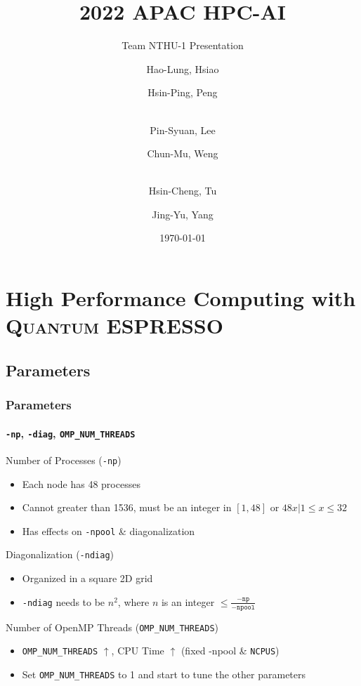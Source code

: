 \documentclass{beamer}
\title{2022 APAC HPC-AI}
\subtitle{Team NTHU-1 Presentation}
\author[NTHU-1]{
    Hao-Lung, Hsiao \and Hsin-Ping, Peng \and\\
    Pin-Syuan, Lee \and Chun-Mu, Weng \and\\
    Hsin-Cheng, Tu \and Jing-Yu, Yang
}
\institute[National Tsing Hua University]{Dept. of Computer Science, Nat'l Tsing Hua U.}
\date{\today}
\begin{document}
\frame{\titlepage}

\frame{\tableofcontents}

\section{High Performance Computing with \textsc{Quantum ESPRESSO}}

\subsection{Parameters}

\begin{frame}
    \frametitle{Parameters}
    \framesubtitle{\texttt{-np}, \texttt{-diag}, \texttt{OMP\_NUM\_THREADS}}
    \begin{alertblock}{Number of Processes (\texttt{-np})}
    \begin{itemize}
        \item Each node has 48 processes
        \item Cannot greater than 1536, must be an integer in $[1,48]$ or ${48x|1\leq x\leq32}$
        \item Has effects on \texttt{-npool} \& diagonalization
    \end{itemize}
    \end{alertblock}
    
    \begin{alertblock}{Diagonalization (\texttt{-ndiag})}
    \begin{itemize}
        \item Organized in a square 2D grid
        \item \texttt{-ndiag} needs to be ${n^2}$, where ${n}$ is an integer $\leq\frac{\mathtt{-np}}{\mathtt{-npool}}$
    \end{itemize}
    \end{alertblock}
    
    \begin{alertblock}{Number of OpenMP Threads (\texttt{OMP\_NUM\_THREADS})}
    \begin{itemize}
        \item \texttt{OMP\_NUM\_THREADS} $\uparrow$, CPU Time $\uparrow$ (fixed -npool \& \texttt{NCPUS}) 
        \item Set \texttt{OMP\_NUM\_THREADS} to 1 and start to tune the other parameters
    \end{itemize}
    \end{alertblock}
\end{frame}
\end{document}
